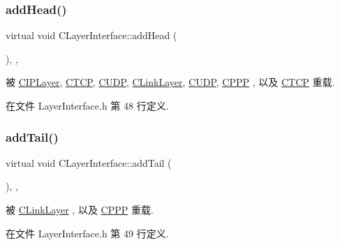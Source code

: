 \subsubsection{\texorpdfstring{add\+Head()}{addHead()}}
{\footnotesize\ttfamily virtual void C\+Layer\+Interface\+::add\+Head (\begin{DoxyParamCaption}{ }\end{DoxyParamCaption})\hspace{0.3cm}{\ttfamily [inline]}, {\ttfamily [protected]}, {\ttfamily [virtual]}}



被 \hyperlink{class_c_i_p_layer_a4a73e335cc0801fe2a7f0de6ab955411}{C\+I\+P\+Layer}, \hyperlink{class_c_t_c_p_a0c68800a3b6317cbe74aa2cb28ea3d9c}{C\+T\+CP}, \hyperlink{class_c_u_d_p_a445c3b7fe1b58e8b278115649ad25c3f}{C\+U\+DP}, \hyperlink{class_c_link_layer_a6ef143071b324acea3cd11ef86ba850f}{C\+Link\+Layer}, \hyperlink{class_c_u_d_p_a445c3b7fe1b58e8b278115649ad25c3f}{C\+U\+DP}, \hyperlink{class_c_p_p_p_aba6a014532e6d329cf1f8dfb591eff72}{C\+P\+PP} , 以及 \hyperlink{class_c_t_c_p_a0c68800a3b6317cbe74aa2cb28ea3d9c}{C\+T\+CP} 重载.



在文件 Layer\+Interface.\+h 第 48 行定义.

\mbox{\label{class_c_layer_interface_a433a6f3322355291bbfc2b97343d493f}} 
\subsubsection{\texorpdfstring{add\+Tail()}{addTail()}}
{\footnotesize\ttfamily virtual void C\+Layer\+Interface\+::add\+Tail (\begin{DoxyParamCaption}{ }\end{DoxyParamCaption})\hspace{0.3cm}{\ttfamily [inline]}, {\ttfamily [protected]}, {\ttfamily [virtual]}}



被 \hyperlink{class_c_link_layer_a0962e4887e1893721031309a1e49a638}{C\+Link\+Layer} , 以及 \hyperlink{class_c_p_p_p_a2b345908338ada3b4d9e58d14270725a}{C\+P\+PP} 重载.



在文件 Layer\+Interface.\+h 第 49 行定义.

\mbox{\label{class_c_layer_interface_a804d604d3e0032e676d02fd5d369607e}} 
